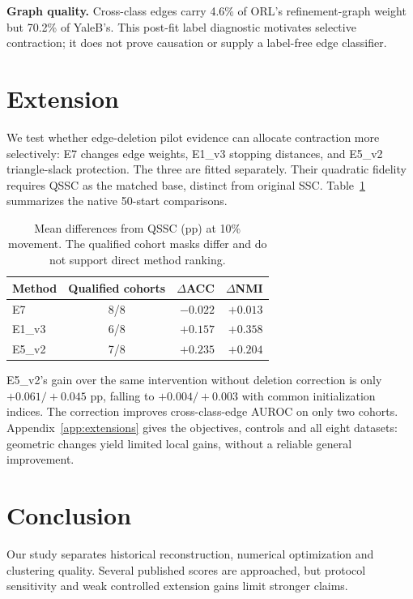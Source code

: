 \textbf{Graph quality.} Cross-class edges carry 4.6\% of ORL's refinement-graph
weight but 70.2\% of YaleB's. This post-fit label diagnostic motivates selective
contraction; it does not prove causation or supply a label-free edge classifier.

\section{Extension}
\label{sec:extension}

We test whether edge-deletion pilot evidence can allocate contraction more
selectively: E7 changes edge weights, E1\_v3 stopping distances, and E5\_v2
triangle-slack protection. The three are fitted separately. Their quadratic
fidelity requires QSSC as the matched base, distinct from original SSC.
Table~\ref{tab:extension_main} summarizes the native 50-start comparisons.

\begin{table}[!htbp]
\centering
\caption{Mean differences from QSSC (pp) at 10\% movement.
The qualified cohort masks differ and do not support direct method ranking.}
\label{tab:extension_main}
\small
\setlength{\tabcolsep}{10pt}
\begin{tabular}{@{}lcrr@{}}
\toprule
Method & Qualified cohorts & $\Delta$ACC & $\Delta$NMI \\
\midrule
E7 & 8/8 & $-0.022$ & $+0.013$ \\
E1\_v3 & 6/8 & $+0.157$ & $+0.358$ \\
E5\_v2 & 7/8 & $+0.235$ & $+0.204$ \\
\bottomrule
\end{tabular}
\end{table}

E5\_v2's gain over the same intervention without deletion correction is only
$+0.061/+0.045$ pp, falling to $+0.004/+0.003$ with common initialization
indices. The correction improves cross-class-edge AUROC on only two cohorts.
Appendix~\ref{app:extensions} gives the objectives, controls and all eight
datasets: geometric changes yield limited local gains, without a reliable
general improvement.

\section{Conclusion}
\label{sec:conclusion}

Our study separates historical reconstruction, numerical optimization and
clustering quality. Several published scores are approached, but protocol
sensitivity and weak controlled extension gains limit stronger claims.

